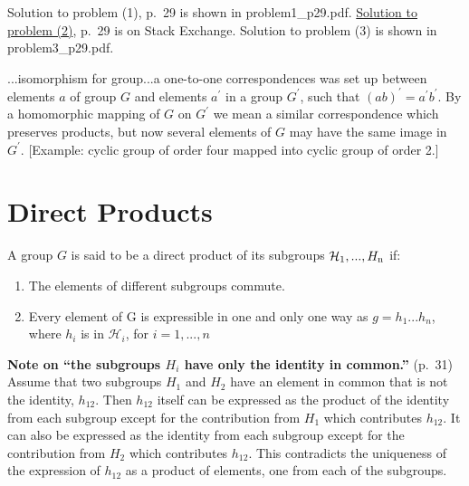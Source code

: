 Solution to problem (1), p.\ 29 is shown in problem1\_p29.pdf. 
\href{https://math.stackexchange.com/questions/84632/subgroup-of-index-2-is-normal}{Solution to problem (2)}, p.\ 29 is on Stack Exchange. Solution to problem (3) is shown in problem3\_p29.pdf.

...isomorphism for group...a one-to-one correspondences was set up
between elements $a$ of group $G$ and elements $a^\prime$ in a group
$G^\prime$, such that $(ab)^\prime = a^\prime b^\prime$. By a
homomorphic mapping of $G$ on $G^\prime$ we mean a similar
correspondence which preserves products, but now several elements of
$G$ may have the same image in $G^\prime$. [Example: cyclic group of
  order four mapped into cyclic group of order 2.]

\section{Direct Products}

A group $G$ is said to be a direct product of its subgroups ${\mathcal
  H_{\rm 1},...,H_{\rm n}}$ if:

\begin{enumerate}
\item The elements of different subgroups commute.
\item Every element of G is expressible in one and only one way as
  $g = h_1...h_n$, where $h_i$ is in ${\mathcal H}_i$, for $i = 1,...,n$
\end{enumerate}

{\bf Note on ``the subgroups $H_i$ have only the identity in
  common.''} (p.\ 31) Assume that two subgroups $H_1$ and $H_2$ have
an element in common that is not the identity, $h_{12}$. Then $h_{12}$
itself can be expressed as the product of the identity from each
subgroup except for the contribution from $H_1$ which contributes
$h_{12}$. It can also be expressed as the identity from each subgroup
except for the contribution from $H_2$ which contributes
$h_{12}$. This contradicts the uniqueness of the expression of
$h_{12}$ as a product of elements, one from each of the subgroups.
